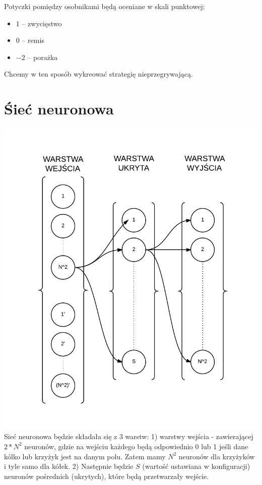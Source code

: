 \documentclass[paper=a4, fontsize=11pt]{scrartcl} %
\numberwithin{equation}{section} %
\numberwithin{figure}{section} %
\numberwithin{table}{section} %
\begin{document}
Potyczki pomiędzy osobnikami będą oceniane w skali punktowej: \\
\begin{itemize}
	\item $1$ -- zwycięstwo
	\item $0$ -- remis
	\item $-2$ -- porażka
\end{itemize}
Chcemy w ten sposób wykreować strategię nieprzegrywającą. \\

\section{Śieć neuronowa}
\includegraphics[scale=1]{diagrams/CoevolutionaryTicTacToe} \\
Sieć neuronowa będzie składała się z 3 warstw:
1) warstwy wejścia - zawierającej $2*N^2$ neuronów, gdzie na wejściu każdego będą odpowiednio 0 lub 1 jeśli dane kólko lub krzyżyk jest na danym polu. Zatem mamy $N^2$ neuronów dla krzyżyków i tyle samo dla kółek.
2) Następnie będzie $S$ (wartość ustawiana w konfiguracji) neuronów pośrednich (ukrytych), które będą przetwarzały wejście.
\end{document}
